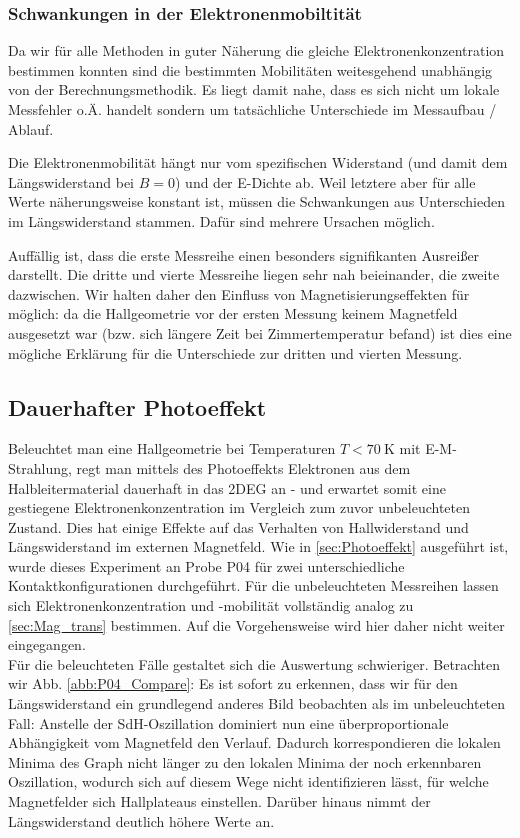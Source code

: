 \subsubsection{Schwankungen in der Elektronenmobiltität} \label{sec:Schwankungen}
Da wir für alle Methoden in guter Näherung die gleiche Elektronenkonzentration bestimmen konnten sind die bestimmten Mobilitäten weitesgehend unabhängig von der Berechnungsmethodik. Es liegt damit nahe, dass es sich nicht um lokale Messfehler o.Ä. handelt sondern um tatsächliche Unterschiede im Messaufbau / Ablauf. 

Die Elektronenmobilität hängt nur vom spezifischen Widerstand (und damit dem Längswiderstand bei $ B = 0 $) und der E-Dichte ab. Weil letztere aber für alle Werte näherungsweise konstant ist, müssen die Schwankungen aus Unterschieden im Längswiderstand stammen. Dafür sind mehrere Ursachen möglich. 

Auffällig ist, dass die erste Messreihe einen besonders signifikanten Ausreißer darstellt. Die dritte und vierte Messreihe liegen sehr nah beieinander, die zweite dazwischen. Wir halten daher den Einfluss von Magnetisierungseffekten für möglich: da die Hallgeometrie vor der ersten Messung keinem Magnetfeld ausgesetzt war (bzw. sich längere Zeit bei Zimmertemperatur befand) ist dies eine mögliche Erklärung für die Unterschiede zur dritten und vierten Messung. 

\clearpage
\subsection{Dauerhafter Photoeffekt}\label{sec:Photo}

Beleuchtet man eine Hallgeometrie bei Temperaturen $T < \SI{70}{\kelvin}$ mit E-M-Strahlung, regt man mittels des Photoeffekts Elektronen aus dem Halbleitermaterial dauerhaft in das 2DEG an - und erwartet somit eine gestiegene Elektronenkonzentration im Vergleich zum zuvor unbeleuchteten Zustand. Dies hat einige Effekte auf das Verhalten von Hallwiderstand und Längswiderstand im externen Magnetfeld. Wie in \autoref{sec:Photoeffekt} ausgeführt ist, wurde dieses Experiment an  Probe P04 für zwei unterschiedliche Kontaktkonfigurationen durchgeführt. Für die unbeleuchteten Messreihen lassen sich Elektronenkonzentration und -mobilität vollständig analog zu \autoref{sec:Mag_trans} bestimmen. Auf die Vorgehensweise wird hier daher nicht weiter eingegangen. \\

Für die beleuchteten Fälle gestaltet sich die Auswertung schwieriger. Betrachten wir Abb. \ref{abb:P04_Compare}: Es ist sofort zu erkennen, dass wir für den Längswiderstand ein grundlegend anderes Bild beobachten als im unbeleuchteten Fall: Anstelle der SdH-Oszillation dominiert nun eine überproportionale Abhängigkeit vom Magnetfeld den Verlauf. Dadurch korrespondieren die lokalen Minima des Graph nicht länger zu den lokalen Minima der noch erkennbaren Oszillation, wodurch sich auf diesem Wege nicht identifizieren lässt, für welche Magnetfelder sich Hallplateaus einstellen. Darüber hinaus nimmt der Längswiderstand deutlich höhere Werte an.

